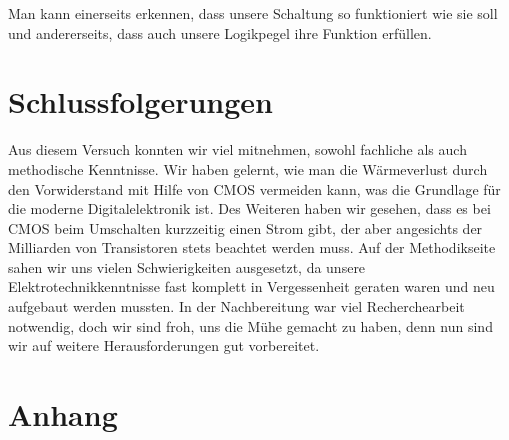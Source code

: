 \documentclass[12pt,a4paper]{scrartcl}
\begin{document}
Man kann einerseits erkennen, dass unsere Schaltung so funktioniert wie sie soll und andererseits, dass auch unsere Logikpegel ihre Funktion erf\"ullen.

\section{Schlussfolgerungen}
Aus diesem Versuch konnten wir viel mitnehmen, sowohl fachliche als auch methodische Kenntnisse.
Wir haben gelernt, wie man die W\"armeverlust durch den Vorwiderstand mit Hilfe von CMOS vermeiden kann, was die Grundlage f\"ur die moderne Digitalelektronik ist.
Des Weiteren haben wir gesehen, dass es bei CMOS beim Umschalten kurzzeitig einen Strom gibt, der aber angesichts der Milliarden von Transistoren stets beachtet werden muss.
Auf der Methodikseite sahen wir uns vielen Schwierigkeiten ausgesetzt, da unsere Elektrotechnikkenntnisse fast komplett in Vergessenheit geraten waren und neu aufgebaut werden mussten.
In der Nachbereitung war viel Recherchearbeit notwendig, doch wir sind froh, uns die M\"uhe gemacht zu haben, denn nun sind wir auf weitere Herausforderungen gut vorbereitet.

\clearpage

\section{Anhang}


\end{document}
